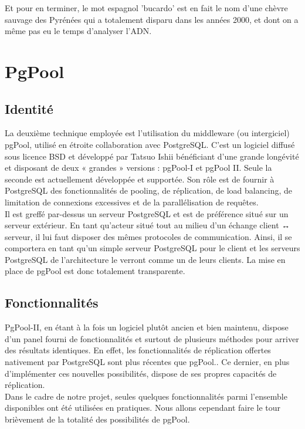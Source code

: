 \documentclass[12pt]{report}
\begin{document}
Et pour en terminer, le mot espagnol 'bucardo' est en fait le nom d'une chèvre
sauvage des Pyrénées qui a totalement disparu dans les années 2000, et dont on
a même pas eu le temps d'analyser l'ADN.\\


\section{PgPool}
\subsection{Identité}

La deuxième technique employée est l'utilisation du middleware (ou intergiciel)
pgPool, utilisé en étroite collaboration avec PostgreSQL. C'est un logiciel
diffusé sous licence BSD et développé par Tatsuo Ishii bénéficiant d'une grande
longévité et disposant de deux « grandes » versions : pgPool-I et pgPool
II. Seule la seconde est actuellement développée et supportée. Son rôle est de
fournir à PostgreSQL des fonctionnalités de pooling, de réplication, de load
balancing, de limitation de connexions excessives et de la parallélisation de
requêtes. \\


Il est greffé par-dessus un serveur PostgreSQL et est de préférence situé sur
un serveur extérieur. En tant qu'acteur situé tout au milieu d'un échange client
↔ serveur, il lui faut disposer des mêmes protocoles de communication. Ainsi, il
se comportera en tant qu'un simple serveur PostgreSQL pour le client et les
serveurs PostgreSQL de l'architecture le verront comme un de leurs clients. La
mise en place de pgPool est donc totalement transparente. \\


\subsection{Fonctionnalités}

PgPool-II, en étant à la fois un logiciel plutôt ancien et bien
maintenu, dispose d'un panel fourni de fonctionnalités et surtout de plusieurs
méthodes pour arriver des résultats identiques. En effet, les fonctionnalités de
réplication offertes nativement par PostgreSQL sont plus récentes que
pgPool.. Ce dernier, en plus d'implémenter ces nouvelles possibilités, dispose
de ses propres capacités de réplication. \\


Dans le cadre de notre projet, seules quelques fonctionnalités parmi l'ensemble
disponibles ont été utilisées en pratiques. Nous allons cependant faire le tour
brièvement de la totalité des possibilités de pgPool. \\
\end{document}
